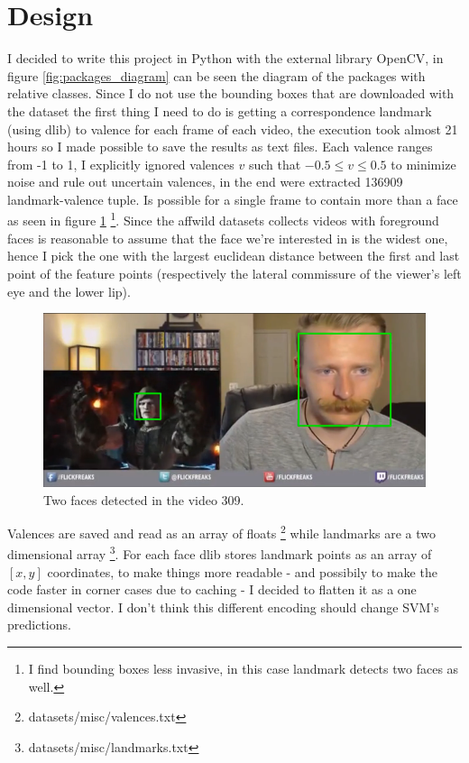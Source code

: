 \section{Design}
I decided to write this project in Python with the external library OpenCV, in figure \ref{fig:packages_diagram} can be seen the diagram of the packages with relative classes.
Since I do not use the bounding boxes that are downloaded with the dataset the first thing I need to do is getting a correspondence landmark (using dlib) to valence for each frame of each video, the execution took almost 21 hours so I made possible to save the results as text files.
Each valence ranges from -1 to 1, I explicitly ignored valences $v$ such that $-0.5 \leq v \leq 0.5 $ to minimize noise and rule out uncertain valences, in the end were extracted 136909 landmark-valence tuple.
Is possible for a single frame to contain more than a face as seen in figure \ref{fig:double_face} \footnote{I find bounding boxes less invasive, in this case landmark detects two faces as well.}.
Since the affwild datasets collects videos with foreground faces is reasonable to assume that the face we're interested in is the widest one, hence I pick the one with the largest euclidean distance between the first and last point of the feature points (respectively the lateral commissure of the viewer's left eye and the lower lip).

\begin{figure}[h!t]
    \centering
    \includegraphics[scale=0.4]{images/309mp4_double_face.png}
    \caption{Two faces detected in the video 309.}
    \label{fig:double_face}
\end{figure}

Valences are saved and read as an array of floats \footnote{datasets/misc/valences.txt} while landmarks are a two dimensional array \footnote{datasets/misc/landmarks.txt}. 
For each face dlib stores landmark points as an array of $[x,y]$ coordinates, to make things more readable - and possibily to make the code faster in corner cases due to caching - I decided to flatten it as a one dimensional vector. 
I don't think this different encoding should change SVM's predictions.

